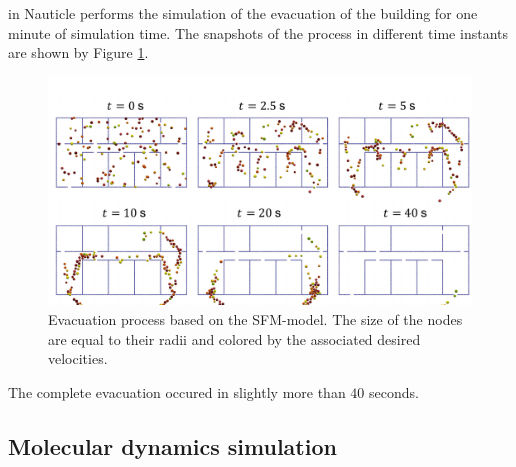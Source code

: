 \documentclass[a4paper,12pt,openany]{book}
\theoremstyle{break}
\begin{document}
in Nauticle performs the simulation of the evacuation of the building for one minute of simulation time. The snapshots of the process in different time instants are shown by Figure \ref{fig:SMF_result}.
\begin{figure}[H]
  \includegraphics[scale=0.6]{evacuation_result.pdf}
  \centering
  \caption{Evacuation process based on the SFM-model. The size of the nodes are equal to their radii and colored by the associated desired velocities.}
  \label{fig:SMF_result}
\end{figure}\vspace*{3pt}
The complete evacuation occured in slightly more than $40$ seconds.

\subsection{Molecular dynamics simulation} \label{sec:MD_example}
\end{document}
